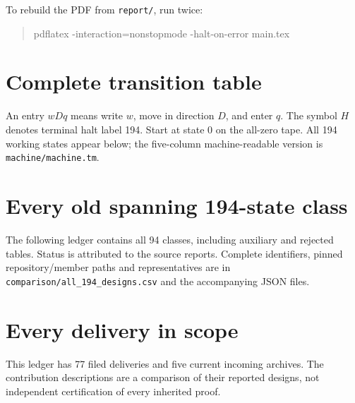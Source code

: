 \documentclass[11pt,letterpaper]{article}
\newcommand{\file}[1]{\texttt{\nolinkurl{#1}}}
\begin{document}
To rebuild the PDF from \file{report/}, run twice:
\begin{quote}\ttfamily
pdflatex -interaction=nonstopmode -halt-on-error main.tex
\end{quote}
\clearpage
\appendix
\section{Complete transition table}
\label{app:table}
An entry $wDq$ means write $w$, move in direction $D$, and enter $q$.
The symbol $H$ denotes terminal halt label 194. Start at state 0 on the
all-zero tape. All 194 working states appear below; the five-column
machine-readable version is \file{machine/machine.tm}.


\clearpage
\section{Every old spanning 194-state class}
\label{app:frontier}
The following ledger contains all 94 classes, including auxiliary and
rejected tables. Status is attributed to the source reports. Complete
identifiers, pinned repository/member paths and representatives are in
\file{comparison/all_194_designs.csv} and the accompanying JSON files.


\clearpage
\section{Every delivery in scope}
\label{app:packets}
This ledger has 77 filed deliveries and five current incoming archives.
The contribution descriptions are a comparison of their reported designs,
not independent certification of every inherited proof.

\end{document}
